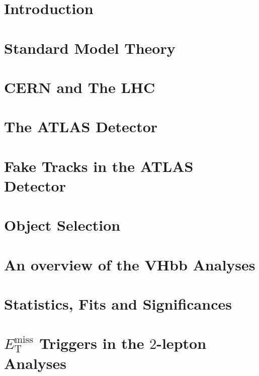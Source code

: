 \documentclass[12pt,titlepage,oneside]{book}
\newcommand{\met}{\ensuremath{E_{\text{T}}^{\text{miss}}} }            %
\newcommand{\tlep}{\ensuremath{2}-lepton }
\begin{document}
\doublespacing

\mainmatter %
\linenumbers %

\chapter{Introduction}
\label{chap:intro}


\chapter{Standard Model Theory}
\label{chap:theory}


\chapter{CERN and The LHC}
\label{chap:CERNLHC}


\chapter{The ATLAS Detector}
\label{chap:ATLAS}


\chapter{Fake Tracks in the ATLAS Detector}
\label{chap:FakeTracks}


\chapter{Object Selection}
\label{chap:ObjSel}


\chapter{An overview of the VHbb Analyses}
\label{chap:Analyses}


\chapter{Statistics, Fits and Significances}
\label{chap:Statfits}


\chapter{\met Triggers in the \tlep Analyses} %
\label{chap:METTriggerStudy}

\end{document}
